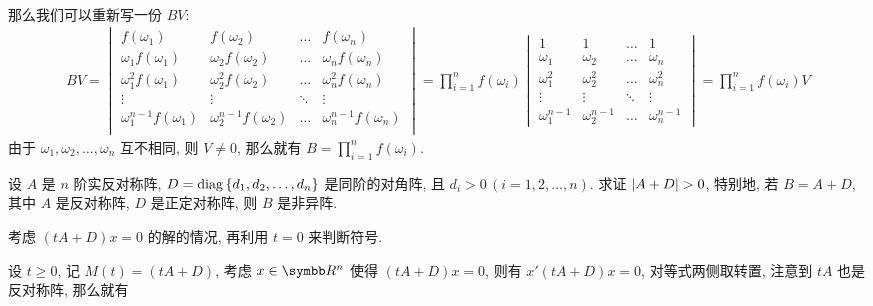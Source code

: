 \documentclass{ctexart}
\begin{document}
\begin{exercise}[series=exer]
\begin{answer}
\begin{align*}
        \end{align*}
        那么我们可以重新写一份 $ BV $:
        \begin{align*}
            BV = \begin{vmatrix}
                f(\omega_{1}) & f(\omega_{2}) & \dots & f(\omega_{n})\\
                \omega_{1}f(\omega_{1}) & \omega_{2}f(\omega_{2}) & \dots & \omega_{n}f(\omega_{n})\\
                \omega_{1}^{2}f(\omega_{1}) & \omega_{2}^{2}f(\omega_{2}) & \dots & \omega_{n}^{2}f(\omega_{n})\\
                \vdots & \vdots & \ddots & \vdots\\
                \omega_{1}^{n-1}f(\omega_{1}) & \omega_{2}^{n-1}f(\omega_{2}) & \dots & \omega_{n}^{n-1}f(\omega_{n})\\
            \end{vmatrix} = \prod_{i = 1}^{n}f(\omega_{i}) 
            \begin{vmatrix}
                1 & 1 & \dots & 1\\
                \omega_{1} & \omega_{2} & \dots & \omega_{n}\\
                \omega_{1}^{2} & \omega_{2}^{2} & \dots & \omega_{n}^{2}\\
                \vdots & \vdots & \ddots & \vdots\\
                \omega_{1}^{n-1} & \omega_{2}^{n-1} & \dots & \omega_{n}^{n-1}
            \end{vmatrix}= \prod_{i = 1}^{n}f(\omega_{i})V
        \end{align*} 
        由于 $ \omega_{1}, \omega_{2}, \dots, \omega_{n} $ 互不相同, 则 $ V \ne 0 $, 那么就有 $ B = \prod_{i = 1}^{n}f(\omega_{i}) $.
    \end{answer}
    \sitem\label{item:反称加对角} 设 $ A $ 是 $ n $ 阶实反对称阵, $ D = \operatorname{diag}\qty{d_{1}, d_{2}, \dots, d_{n}} $ 是同阶的对角阵, 且 $ d_{i} > 0\,(i = 1, 2, \dots, n) $. 求证 $ \abs{A + D} > 0 $, 特别地, 若 $ B = A + D $, 其中 $ A $ 是反对称阵, $ D $ 是正定对称阵, 则 $ B $ 是非异阵. 
    \begin{hint}
        考虑 $ (tA + D)x = 0 $ 的解的情况, 再利用 $ t = 0 $ 来判断符号. 
    \end{hint}
    \begin{answer}
        设 $ t \ge 0 $, 记 $ M(t) = (tA + D) $, 考虑 $ x \in \R^{n} $ 使得 $ (tA + D)x = 0 $, 则有 $ x'(tA + D)x = 0 $, 对等式两侧取转置, 注意到 $ tA $ 也是反对称阵, 那么就有
        \begin{align*}

\end{align*}
\end{answer}
\end{exercise}
\end{document}
